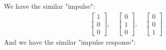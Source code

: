     We have the similar "impulse":
        \begin{equation}
            \begin{aligned}
                \begin{bmatrix}
                            1\\
                            0\\
                            0
                    \end{bmatrix},\quad
                \begin{bmatrix}
                            0\\
                            1\\
                            0
                    \end{bmatrix},\quad
               \begin{bmatrix}
                            0\\
                            0\\
                            1
                    \end{bmatrix}
            \end{aligned}
        \end{equation}
    And we have the similar "impulse response":
